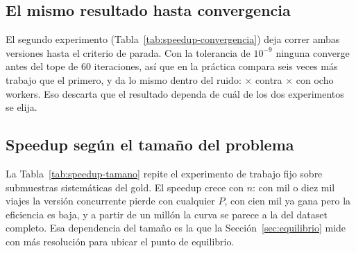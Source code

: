 \subsection{El mismo resultado hasta convergencia}



El segundo experimento (Tabla~\ref{tab:speedup-convergencia}) deja correr ambas versiones hasta el
criterio de parada. Con la tolerancia de $10^{-9}$ ninguna converge antes del tope de 60 iteraciones,
así que en la práctica compara seis veces más trabajo que el primero, y da lo mismo dentro del ruido:
$\times$ contra $\times$ con ocho workers. Eso descarta que
el resultado dependa de cuál de los dos experimentos se elija.

\subsection{Speedup según el tamaño del problema}



La Tabla~\ref{tab:speedup-tamano} repite el experimento de trabajo fijo sobre submuestras
sistemáticas del gold. El speedup crece con $n$: con mil o diez mil viajes la versión concurrente
pierde con cualquier $P$, con cien mil ya gana pero la eficiencia es baja, y a partir de un millón
la curva se parece a la del dataset completo. Esa dependencia del tamaño es la que la
Sección~\ref{sec:equilibrio} mide con más resolución para ubicar el punto de equilibrio.
